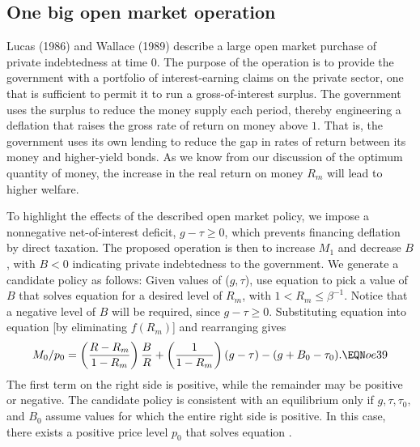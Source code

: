 \subsection{One big open market operation}
Lucas (1986) and Wallace (1989) describe  a  large open market
purchase of private indebtedness at time 0.  The purpose of the
operation is to provide the government with a portfolio of
interest-earning claims on the private sector, one that is
sufficient to permit it to run a gross-of-interest surplus.  The
government uses the surplus to reduce the money supply each
period, thereby engineering a deflation that raises the gross rate of
return on money above $1$. That is, the government uses its own
lending to reduce the gap in rates of return between its money and
higher-yield bonds. As we know from our discussion of the optimum \newpage \noindent
quantity of money, the increase in the real return on money $R_m$
will lead to higher
 welfare.


To highlight the effects of the described open market policy, we
impose a nonnegative net-of-interest deficit, $g-\tau\geq 0$,
which prevents financing deflation by direct taxation.
The proposed operation is then to
increase $M_1$ and decrease $B$, with $B<0$ indicating
private indebtedness to the government. We generate a candidate
policy as follows:
Given values of ($g,\tau$), use equation 
to pick a value of $B$ that solves equation
 for a desired level of $R_m$, with
$1 < R_m \leq \beta^{-1}$.  Notice that
a negative level of $B$ will be required, since $g-\tau\geq 0$.
Substituting equation  into equation 
[by eliminating $f(R_m)$] and rearranging gives
$$ M_0/p_0 = \left({R-R_m\over 1-R_m}\right){B\over R} +
         \left({1\over 1-R_m}\right) (g-\tau) -
             (g+B_0-\tau_0) . \EQN oe39$$
The first term on the right side is positive,
while the remainder may be positive or negative.  The candidate
policy is  consistent with an equilibrium only if
$g,\tau,\tau_0,$ and $B_0$ assume values for which the
entire right side is positive.  In this case, there exists
a positive price level $p_0$ that solves equation .


